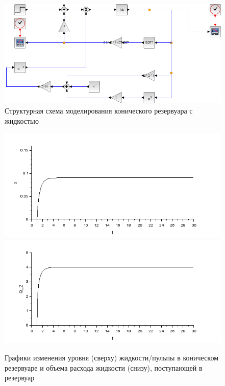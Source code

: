 \documentclass[a4paper, 12pt]{article}
\begin{document}
\begin{figure}[h!]
	\centering
	\includegraphics[scale=0.5]{scheme2}
	\caption{Структурная схема моделирования конического резервуара с жидкостью}
	\label{p:конический_резервуар_схема}
\end{figure}


\begin{figure}[h!]
	\centering
	\includegraphics[scale=0.8]{graph2-2}
	\includegraphics[scale=0.8]{graph2-1}
	\caption{Графики изменения уровня (сверху) жидкости/пульпы в коническом резервуаре и объема расхода жидкости (снизу), поступающей в резервуар}
	\label{p:конический_резервуар_графики}
\end{figure}

\newpage
\end{document}
